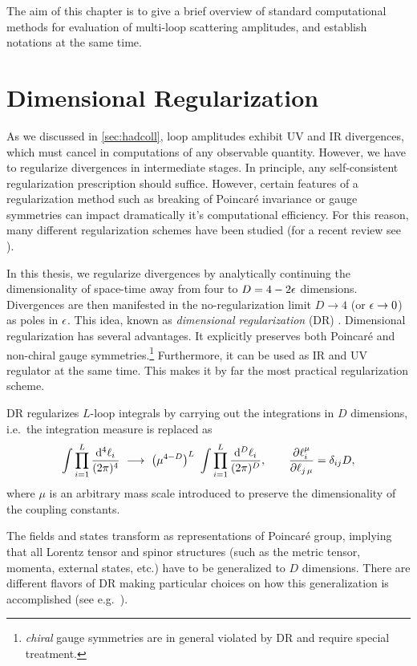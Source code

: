 The aim of this chapter is to give a brief overview of standard computational methods for 
evaluation of multi-loop scattering amplitudes, and establish notations at the same time.

\section{Dimensional Regularization}



As we discussed in \cref{sec:hadcoll}, loop amplitudes exhibit UV and IR divergences,
which must cancel in computations of any observable quantity.
However, we have to regularize divergences in intermediate stages.
In principle, any self-consistent regularization prescription should suffice.
However, certain features of a regularization method such as breaking of Poincaré invariance or gauge symmetries
can impact dramatically it's computational efficiency.
For this reason, many different regularization schemes have been studied (for a recent review see \cite{Gnendiger:2017pys}).

In this thesis, we regularize divergences by analytically continuing the dimensionality of space-time away from four to $D = 4 - 2\epsilon$ dimensions.
Divergences are then manifested in the no-regularization limit $D\to4$ (or $\epsilon\to0$) as poles in $\epsilon$.
This idea, known as \emph{dimensional regularization} (DR) \cite{tHooft:1972tcz}.
Dimensional regularization has several advantages.
It explicitly preserves both Poincaré and non-chiral gauge symmetries.\footnote{\emph{chiral} gauge symmetries are in general violated by DR and require special treatment.}
Furthermore, it can be used as IR and UV regulator at the same time.
This makes it by far the most practical regularization scheme.


DR regularizes $L$-loop integrals by carrying out the integrations in $D$ dimensions, i.e.\ the integration measure is replaced as
\begin{equation}
  \int \prod_{i=1}^{L} \frac{\dd[4]{\ell_i}}{(2\pi)^{4}} ~\longrightarrow~ \quantity(\mu^{4-D})^{L}~\int \prod_{i=1}^{L} \frac{\dd[D]{\ell_i}}{(2\pi)^{D}}, \qquad \pdv{\ell^\mu_i}{\ell_{j\,\mu}} = \delta_{i j} D,
  \label{eq:dimregmeasure}
\end{equation}
where $\mu$ is an arbitrary mass scale introduced to preserve the dimensionality of the coupling constants.

The fields and states transform as representations of Poincaré group,
implying that all Lorentz tensor and spinor structures (such as the metric tensor, momenta, external states, etc.\@) have
to be generalized to $D$ dimensions.
There are different flavors of DR making particular choices on how this generalization is accomplished (see e.g.\ \cite{Gnendiger:2017pys}).

